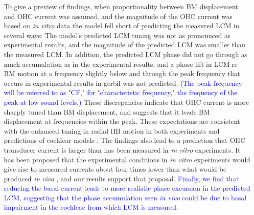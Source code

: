 \documentclass{biophys-new}
\begin{document}
\par{To give a preview of findings, when proportionality between BM displacement and OHC current was assumed, and the magnitude of the OHC current was based on \textit{in vitro} data \cite{he_jia_dallos_2004} the model fell short of predicting the measured LCM in several ways:  The model's predicted LCM tuning was not as pronounced as experimental results, and the magnitude of the predicted LCM was smaller than the measured LCM. In addition, the predicted LCM phase did not go through as much accumulation as in the experimental results, and a phase lift in LCM re BM motion at a frequency slightly below and through the peak frequency that occurs in experimental results in gerbil was not predicted. \textcolor{blue}{(The peak frequency will be referred to as "CF," for "characteristic frequency," the frequency of the peak at low sound levels.)} These discrepancies indicate that OHC current is more sharply tuned than BM displacement, and suggests that it leads BM displacement at frequencies within the peak. These expectations are consistent with the enhanced tuning in radial HB motion in both experiments and predictions of cochlear models \cite{lee,nankaliwang}.  The findings also lead to a prediction that OHC transducer current is larger than has been measured in \textit{in vitro} experiments. It has been proposed that the experimental conditions in \textit{in vitro} experiments would give rise to measured currents about four times lower than what would be produced \textit{in vivo} \cite{kennedy,johnson_2011}, and our results support that proposal. \textcolor{blue}{Finally, we find that reducing the basal current leads to more realistic phase excursion in the predicted LCM, suggesting that the phase accumulation seen \textit{in vivo} could be due to basal impairment in the cochleae from which LCM is measured.}}
\end{document}
